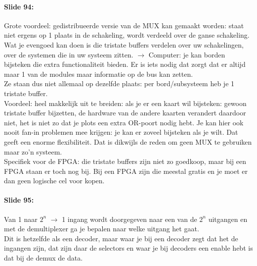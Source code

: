 \documentclass[10pt,a4paper]{book}
\begin{document}
\paragraph{Slide 94:} Grote voordeel: gedistribueerde versie van de MUX kan gemaakt worden: staat niet ergens op 1 plaats in de schakeling, wordt verdeeld over de ganse schakeling. Wat je evengoed kan doen is die tristate buffers verdelen over uw schakelingen, over de systemen die in uw systeem zitten. $\rightarrow$ Computer: je kan borden bijsteken die extra functionaliteit bieden. Er is iets nodig dat zorgt dat er altijd maar 1 van de modules maar informatie op de bus kan zetten.\\
Ze staan dus niet allemaal op dezelfde plaats: per bord/subsysteem heb je 1 tristate buffer.\\
Voordeel: heel makkelijk uit te breiden: als je er een kaart wil bijsteken: gewoon tristate buffer bijzetten, de hardware van de andere kaarten verandert daardoor niet, het is niet zo dat je plots een extra OR-poort nodig hebt. Je kan hier ook nooit fan-in problemen mee krijgen: je kan er zoveel bijsteken als je wilt. Dat geeft een enorme flexibiliteit. Dat is dikwijls de reden om geen MUX te gebruiken maar zo'n systeem.\\
Specifiek voor de FPGA: die tristate buffers zijn niet zo goedkoop, maar bij een FPGA staan er toch nog bij. Bij een FPGA zijn die meestal gratis en je moet er dan geen logische cel voor kopen.

\paragraph{Slide 95:} Van 1 naar $2^n$ $\rightarrow$ 1 ingang wordt doorgegeven naar een van de $2^n$ uitgangen en met de demultiplexer ga je bepalen naar welke uitgang het gaat.\\
Dit is hetzelfde als een decoder, maar waar je bij een decoder zegt dat het de ingangen zijn, dat zijn daar de selectors en waar je bij decoders een enable hebt is dat bij de demux de data.
\end{document}
